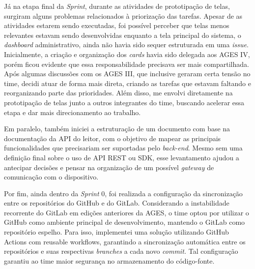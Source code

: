 \indent Já na etapa final da \textit{S}\textit{print}, durante as atividades de prototipação de telas, surgiram alguns problemas relacionados à priorização das tarefas. Apesar de as atividades estarem sendo executadas, foi possível perceber que telas menos relevantes estavam sendo desenvolvidas enquanto a tela principal do sistema, o \textit{dashboard} administrativo, ainda não havia sido sequer estruturada em uma \textit{issue}. Inicialmente, a criação e organização dos \textit{cards} havia sido delegada aos AGES IV, porém ficou evidente que essa responsabilidade precisava ser mais compartilhada. Após algumas discussões com os AGES III, que inclusive geraram certa tensão no time, decidi atuar de forma mais direta, criando as tarefas que estavam faltando e reorganizando parte das prioridades. Além disso, me envolvi diretamente na prototipação de telas junto a outros integrantes do time, buscando acelerar essa etapa e dar mais direcionamento ao trabalho.\par

\indent Em paralelo, também iniciei a estruturação de um documento com base na documentação da API do leitor, com o objetivo de mapear as principais funcionalidades que precisariam ser suportadas pelo \textit{back-end}. Mesmo sem uma definição final sobre o uso de API REST ou SDK, esse levantamento ajudou a antecipar decisões e pensar na organização de um possível \textit{gateway} de comunicação com o dispositivo.\par

\indent Por fim, ainda dentro da \textit{S}\textit{print} 0, foi realizada a configuração da sincronização entre os repositórios do GitHub e do GitLab. Considerando a instabilidade recorrente do GitLab em edições anteriores da AGES, o time optou por utilizar o GitHub como ambiente principal de desenvolvimento, mantendo o GitLab como repositório espelho. Para isso, implementei uma solução utilizando GitHub Actions com reusable workflows, garantindo a sincronização automática entre os repositórios e suas respectivas \textit{branches} a cada novo \textit{commit.} Tal configuração garantiu ao time maior segurança no armazenamento do código-fonte.\par

